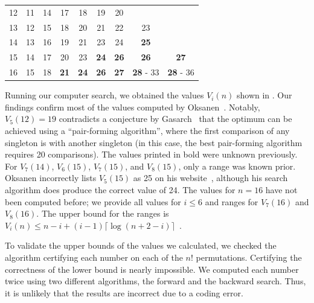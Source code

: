 \documentclass[twoside,leqno,twocolumn]{article}
\begin{document}
\begin{table}[!t]
\begin{tabular}{c|cccccccc}
    12  & 11                      & 14 & 17          & 18          & 19          & 20                                                \\
    13  & 12                      & 15 & 18          & 20          & 21          & 22          & 23                                  \\
    14  & 13                      & 16 & 19          & 21          & 23          & 24          & \textbf{25}                         \\
    15  & 14                      & 17 & 20          & 23          & \textbf{24} & \textbf{26} & \textbf{26}      & \textbf{27}      \\
    16  & 15                      & 18 & \textbf{21} & \textbf{24} & \textbf{26} & \textbf{27} & \textbf{28} - 33 & \textbf{28} - 36 \\
  \end{tabular}
\end{table}

Running our computer search, we obtained the values $V_i(n)$ shown in .
Our findings confirm most of the values computed by Oksanen~\cite{Oksanen}.
Notably, $V_5(12) = 19$ contradicts a conjecture by Gasarch~\cite{Gasarch1996} that the optimum can be achieved using a ``pair-forming algorithm'', where the first comparison of any singleton is with another singleton (in this case, the best pair-forming algorithm requires 20 comparisons).
The values printed in bold were unknown previously.
For $V_7(14)$, $V_6(15)$, $V_7(15)$, and $V_8(15)$, only a range was known prior.
Oksanen incorrectly lists $V_5(15)$ as 25 on his website~\cite{Oksanen}, although his search algorithm does produce the correct value of 24.
The values for $n = 16$ have not been computed before; we provide all values for $i \leq 6$ and ranges for $V_7(16)$ and $V_8(16)$.
The upper bound for the ranges is $V_i(n) \le n - i + (i - 1) \lceil \log (n + 2 - i) \rceil$~\cite{hadian1969selecting}.

To validate the upper bounds of the values we calculated, we checked the algorithm certifying each number on each of the $n!$ permutations.
Certifying the correctness of the lower bound is nearly impossible.
We computed each number twice using two different algorithms, the forward and the backward search.
Thus, it is unlikely that the results are incorrect due to a coding error.
\end{document}
